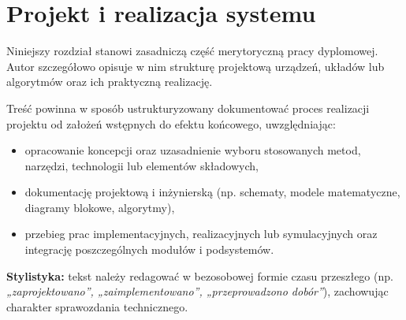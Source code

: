 
\chapter{Projekt i realizacja systemu}
\label{ch:projekt} %

Niniejszy rozdział stanowi zasadniczą część merytoryczną pracy dyplomowej. Autor szczegółowo opisuje w nim strukturę projektową urządzeń, układów lub algorytmów oraz ich praktyczną realizację. 

Treść powinna w sposób ustrukturyzowany dokumentować proces realizacji projektu od założeń wstępnych do efektu końcowego, uwzględniając:
\begin{itemize}
	\item opracowanie koncepcji oraz uzasadnienie wyboru stosowanych metod, narzędzi, technologii lub elementów składowych,
	
	\item dokumentację projektową i inżynierską (np. schematy, modele matematyczne, diagramy blokowe, algorytmy),
	
	\item przebieg prac implementacyjnych, realizacyjnych lub symulacyjnych oraz integrację poszczególnych modułów i podsystemów.
\end{itemize}

\noindent \textbf{Stylistyka:} tekst należy redagować w bezosobowej formie czasu przeszłego (np. \textit{„zaprojektowano”, „zaimplementowano”, „przeprowadzono dobór”}), zachowując charakter sprawozdania technicznego.

